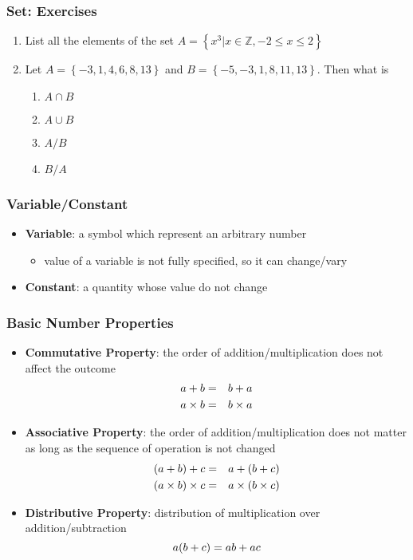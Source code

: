 \documentclass[pdflatex, 12pt]{beamer}
\newcommand{\Z}{\mathbb{Z}}
\begin{document}
\begin{frame}
\frametitle{Set: Exercises}
\begin{enumerate}
\item List all the elements of the set $A = \left\{x^3|x \in \Z, -2 \le x \le 2\right\}$
\vspace{0.4cm}
\item Let $A = \left\{-3, 1, 4, 6, 8, 13\right\}$ and $B = \left\{-5, -3, 1, 8, 11, 13\right\}$. Then what is
 \begin{enumerate}
 \item $A \cap B$
 \item $A \cup B$
 \item $A/B$
 \item $B/A$
 \end{enumerate}
\end{enumerate}
\end{frame}

\begin{frame}
\frametitle{Variable/Constant}
\begin{itemize}
\item \textbf{Variable}: a symbol which represent an arbitrary number
 \begin{itemize}
 \item value of a variable is not fully specified, so it can change/vary
 \end{itemize}
\vspace{0.4cm}
\item \textbf{Constant}: a quantity whose value do not change 
\end{itemize}
\end{frame}

\begin{frame}
\frametitle{Basic Number Properties}
\begin{itemize}
\item \textbf{Commutative Property}: the order of addition/multiplication does not affect the outcome
 \begin{eqnarray}
 a + b &=& b + a \notag \\
 a \times b &=& b \times a \notag
 \end{eqnarray}
\item \textbf{Associative Property}: the order of addition/multiplication does not matter as long as the sequence of operation is not changed
 \begin{eqnarray}
 (a + b) + c &=& a + (b + c) \notag \\
 (a \times b) \times c &=& a \times (b \times c) \notag
 \end{eqnarray}
\item \textbf{Distributive Property}: distribution of multiplication over addition/subtraction
 \begin{equation}
 a (b + c) = ab + ac \notag
 \end{equation}
\end{itemize}
\end{frame}
\end{document}
